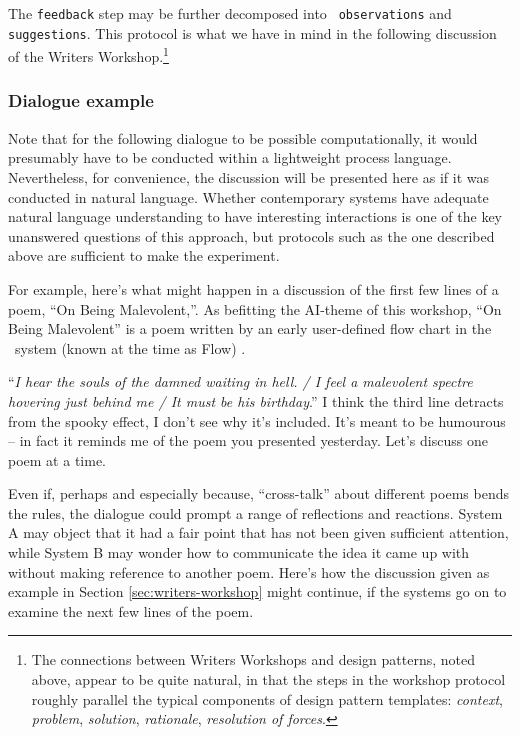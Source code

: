 The {\tt feedback} step may be further decomposed into {\tt
  observations} and {\tt suggestions}.  This protocol is what we have
in mind in the following discussion of the Writers
Workshop.\footnote{The connections between Writers Workshops and
  design patterns, noted above, appear to be quite natural, in that
  the steps in the workshop protocol roughly parallel the typical
  components of design pattern templates: \emph{context},
  \emph{problem}, \emph{solution}, \emph{rationale}, \emph{resolution
    of forces}.}

\subsubsection{Dialogue example}
Note that for the following dialogue to be possible computationally,
it would presumably have to be conducted within a lightweight process
language.  Nevertheless, for convenience, the discussion will be
presented here as if it was conducted in natural language.  Whether
contemporary systems have adequate natural language understanding to
have interesting interactions is one of the key unanswered questions
of this approach, but protocols such as the one described above are sufficient to make the experiment.

For example, here's what might happen in a discussion of the first few
lines of a poem, ``On Being Malevolent,''. As befitting the AI-theme
of this workshop, ``On Being Malevolent'' is a poem written by an
early user-defined flow chart in the \Fw\ system (known at the time as
{\sf Flow}) \cite{colton-flowcharting}.

\begin{center}
\begin{minipage}{.9\columnwidth}
\begin{dialogue}
 ``\emph{I hear the souls of the
  damned waiting in hell. / I feel a malevolent
  spectre hovering just behind me / It must be
  his birthday}.''
%
 I think the third line detracts
from the spooky effect, I don't see why it's
included.
%
 It's meant to be humourous -- in fact it reminds me
of the poem you presented yesterday.
%
 Let's discuss one poem at a
time.
\end{dialogue}
\end{minipage}
\end{center}

Even if, perhaps and especially because, ``cross-talk'' about
different poems bends the rules, the dialogue could prompt a range of
reflections and reactions.  System A may object that it had a fair
point that has not been given sufficient attention, while System B may
wonder how to communicate the idea it came up with without making
reference to another poem.  Here's how the discussion given as example
in Section \ref{sec:writers-workshop} might continue, if the systems
go on to examine the next few lines of the poem.

